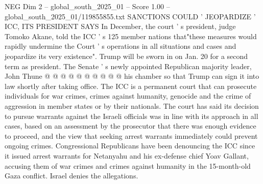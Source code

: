 \begin{textsample}{NEG Dim 2 – global\_south\_2025\_01 – Score 1.00 – global\_south\_2025\_01/119855855.txt}
SANCTIONS COULD ' JEOPARDIZE ' ICC, ITS PRESIDENT SAYS In December, the court ' s president, judge Tomoko Akane, told the ICC ' s 125 member nations that"these measures would rapidly undermine the Court ' s operations in all situations and cases and jeopardize its very existence".
Trump will be sworn in on Jan. 20 for a second term as president.
The Senate ' s newly appointed Republican majority leader, John Thune @ @ @ @ @ @ @ @ @ @ his chamber so that Trump can sign it into law shortly after taking office.
The ICC is a permanent court that can prosecute individuals for war crimes, crimes against humanity, genocide and the crime of aggression in member states or by their nationals.
The court has said its decision to pursue warrants against the Israeli officials was in line with its approach in all cases, based on an assessment by the prosecutor that there was enough evidence to proceed, and the view that seeking arrest warrants immediately could prevent ongoing crimes.
Congressional Republicans have been denouncing the ICC since it issued arrest warrants for Netanyahu and his ex-defense chief Yoav Gallant, accusing them of war crimes and crimes against humanity in the 15-month-old Gaza conflict.
Israel denies the allegations.

\end{textsample}
